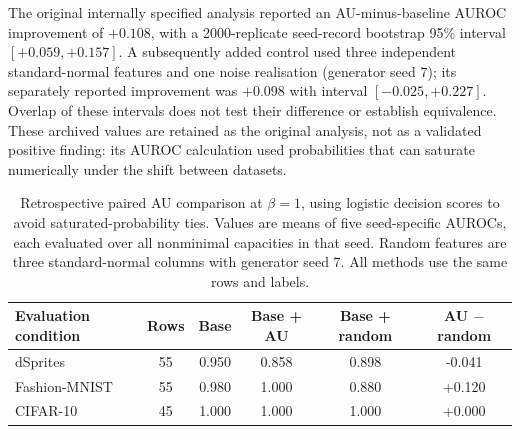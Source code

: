 \documentclass[make,article,submit,pdftex,moreauthors]{Definitions/mdpi}
\begin{document}
The original internally specified analysis reported an AU-minus-baseline
AUROC improvement of $+0.108$, with a 2000-replicate seed-record bootstrap
95\% interval $[+0.059,+0.157]$. A subsequently added control used
three independent standard-normal features and one noise realisation
(generator seed 7); its separately reported improvement was $+0.098$
with interval $[-0.025,+0.227]$. Overlap of these intervals does not test
their difference or establish equivalence. These archived values are
retained as the original analysis, not as a validated positive finding:
its AUROC calculation used probabilities that can saturate numerically
under the shift between datasets.

\begin{table}[H]
\caption{Retrospective paired AU comparison at $\beta=1$, using logistic decision scores to avoid saturated-probability ties. Values are means of five seed-specific AUROCs, each evaluated over all nonminimal capacities in that seed. Random features are three standard-normal columns with generator seed 7. All methods use the same rows and labels.}\label{tab:au}
\footnotesize
\setlength{\tabcolsep}{3.5pt}
\begin{tabular*}{\textwidth}{@{\extracolsep{\fill}}lccccc@{}}
\toprule
Evaluation condition & Rows & Base & Base + AU & Base + random & AU $-$ random \\
\midrule
dSprites & 55 & 0.950 & 0.858 & 0.898 & -0.041 \\
Fashion-MNIST & 55 & 0.980 & 1.000 & 0.880 & +0.120 \\
CIFAR-10 & 45 & 1.000 & 1.000 & 1.000 & +0.000 \\
\bottomrule
\end{tabular*}
\end{table}
\end{document}
